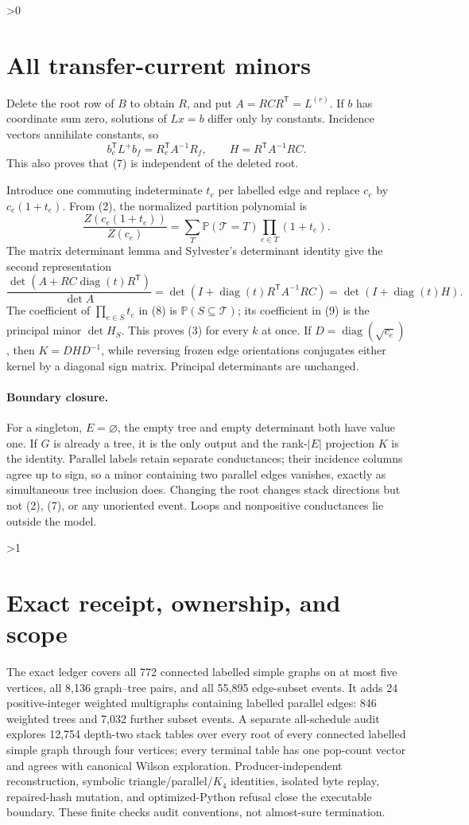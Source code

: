 \documentclass[10pt]{article}
\providecommand{\CRevisionRound}{2}
\newcommand{\Prb}{\mathbb P}
\newcommand{\T}{\mathcal T}
\newcommand{\diag}{\operatorname{diag}}
\begin{document}
\ifnum\CRevisionRound>0
\section{All transfer-current minors}
Delete the root row of $B$ to obtain $R$, and put
$A=RCR^{\mathsf T}=L^{(r)}$.  If $b$ has coordinate sum zero, solutions of
$Lx=b$ differ only by constants.  Incidence vectors annihilate constants, so
\[
 b_e^{\mathsf T}L^+b_f=R_e^{\mathsf T}A^{-1}R_f,
 \qquad H=R^{\mathsf T}A^{-1}RC.                            \tag{7}
\]
This also proves that (7) is independent of the deleted root.

Introduce one commuting indeterminate $t_e$ per labelled edge and replace
$c_e$ by $c_e(1+t_e)$.  From (2), the normalized partition polynomial is
\[
 \frac{Z(c_e(1+t_e))}{Z(c_e)}
 =\sum_T\Prb(\T=T)\prod_{e\in T}(1+t_e).                   \tag{8}
\]
The matrix determinant lemma and Sylvester's determinant identity give the
second representation
\[
 \frac{\det(A+RC\diag(t)R^{\mathsf T})}{\det A}
 =\det(I+\diag(t)R^{\mathsf T}A^{-1}RC)
 =\det(I+\diag(t)H).                                       \tag{9}
\]
The coefficient of $\prod_{e\in S}t_e$ in (8) is
$\Prb(S\subseteq\T)$; its coefficient in (9) is the principal minor
$\det H_S$.  This proves (3) for every $k$ at once.  If
$D=\diag(\sqrt{c_e})$, then $K=DHD^{-1}$, while reversing frozen edge
orientations conjugates either kernel by a diagonal sign matrix.  Principal
determinants are unchanged.

\paragraph{Boundary closure.}
For a singleton, $E=\varnothing$, the empty tree and empty determinant both
have value one.  If $G$ is already a tree, it is the only output and the
rank-$|E|$ projection $K$ is the identity.  Parallel labels retain separate
conductances; their incidence columns agree up to sign, so a minor containing
two parallel edges vanishes, exactly as simultaneous tree inclusion does.
Changing the root changes stack directions but not (2), (7), or any
unoriented event.  Loops and nonpositive conductances lie outside the model.
\fi

\ifnum\CRevisionRound>1
\section{Exact receipt, ownership, and scope}
The exact ledger covers all 772 connected labelled simple graphs on at most
five vertices, all 8,136 graph--tree pairs, and all 55,895 edge-subset events.
It adds 24 positive-integer weighted multigraphs containing labelled parallel
edges: 846 weighted trees and 7,032 further subset events.  A separate
all-schedule audit explores 12,754 depth-two stack tables over every root of
every connected labelled simple graph through four vertices; every terminal
table has one pop-count vector and agrees with canonical Wilson exploration.
Producer-independent reconstruction, symbolic triangle/parallel/$K_4$
identities, isolated byte replay, repaired-hash mutation, and optimized-Python
refusal close the executable boundary.  These finite checks audit conventions,
not almost-sure termination.
\end{document}
